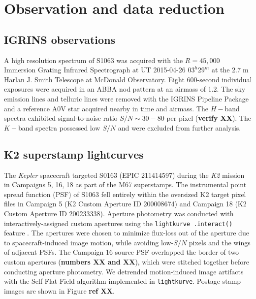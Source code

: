 \documentclass[twocolumn]{emulateapj}%
\begin{document}
\section{Observation and data reduction}
\subsection{IGRINS observations}
A high resolution spectrum of S1063 was acquired with the $R=45,000$ Immersion Grating Infrared Spectrograph \citep[IGRINS;][]{park14} at UT 2015-04-26 $03^h29^m$ at the $2.7\;$m Harlan J. Smith Telescope at McDonald Observatory.  Eight 600-second individual exposures were acquired in an ABBA nod pattern at an airmass of 1.2.  The sky emission lines and telluric lines were removed with the IGRINS Pipeline Package  \citep[PLP;][]{jaejoonlee16} and a reference A0V star acquired nearby in time and airmass.
The $H-$band spectra exhibited signal-to-noise ratio $S/N\sim30-80$ per pixel (\textbf{verify XX}).
The $K-$band spectra possessed low $S/N$ and were excluded from further analysis.


\subsection{K2 superstamp lightcurves}
The \emph{Kepler} spacecraft targeted S0163 (EPIC 211414597) during the \emph{K2} mission \citep{howell14} in Campaigns 5, 16, 18 as part of the M67 superstamps.  The instrumental point spread function (PSF) of S1063 fell entirely within the oversized K2 target pixel files in Campaign 5 (K2 Custom Aperture ID 200008674) and Campaign 18 (K2 Custom Aperture ID 200233338).  Aperture photometry was conducted with interactively-assigned custom apertures using the \texttt{lightkurve .interact()} feature \citep{geert_barentsen_2019_2565212}. The apertures were chosen to minimize flux-loss out of the aperture due to spacecraft-induced image motion, while avoiding low-$S/N$ pixels and the wings of adjacent PSFs.  The Campaign 16 source PSF overlapped the border of two custom apertures (\textbf{numbers XX and XX}), which were stitched together before conducting aperture photometry.
We detrended motion-induced image artifacts with the Self Flat Field algorithm \citep{vanderburg14} implemented in \texttt{lightkurve}.  Postage stamp images are shown in Figure \textbf{ref XX}.
\end{document}
